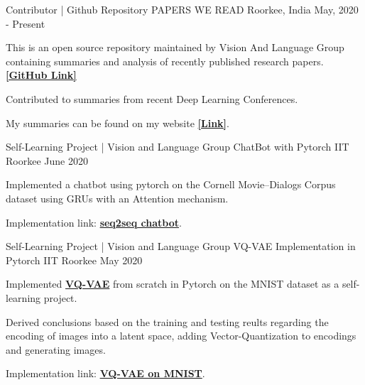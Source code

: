 

\begin{cventries}

  \cventry
    {Contributor | Github Repository} %
    {PAPERS WE READ} %
    {Roorkee, India} %
    {May, 2020 - Present} %
    {
      \begin{cvitems} %
        \item {This is an open source repository maintained by Vision And Language Group containing summaries and analysis of recently published research papers.{\href{https://github.com/vlgiitr/papers_we_read}{\bf [GitHub Link]}}}
        \item {Contributed to summaries from recent Deep Learning Conferences.}
        \item{My summaries can be found on my website {\href{https://praeclarumjj3.github.io/project/summary_of_papers/}{\bf [Link]}}.}
      \end{cvitems}
    }
    
\cventry
    {Self-Learning Project | Vision and Language Group} %
    {ChatBot with Pytorch} %
    {IIT Roorkee} %
    {June 2020} %
    {
      \begin{cvitems} %
        \item {Implemented a chatbot using pytorch on the Cornell Movie--Dialogs Corpus dataset using GRUs with an Attention mechanism.}
        \item {Implementation link: {\href{https://github.com/praeclarumjj3/Chatbot-with-Pytorch}{\bf seq2seq chatbot}}.}
      \end{cvitems}
    }
    
\cventry
    {Self-Learning Project | Vision and Language Group} %
    {VQ-VAE Implementation in Pytorch} %
    {IIT Roorkee} %
    {May 2020} %
    {
      \begin{cvitems} %
        \item {Implemented \href{https://arxiv.org/abs/1711.00937}{\bf VQ-VAE} from scratch in Pytorch on the MNIST dataset as a self-learning project.}
        \item {Derived conclusions based on the training and testing reults regarding the encoding of images into a latent space, adding Vector-Quantization to encodings and generating images.}
        \item {Implementation link: {\href{https://github.com/praeclarumjj3/VQ-VAE-on-MNIST}{\bf VQ-VAE on MNIST}}.}
      \end{cvitems}
    }
      


\end{cventries}
